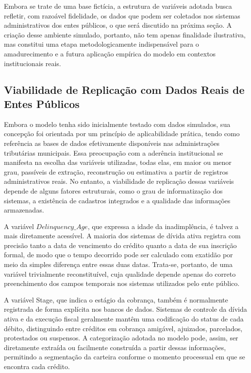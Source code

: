 \documentclass[a4paper,12pt]{article}
\begin{document}
Embora se trate de uma base fictícia, a estrutura de variáveis adotada busca refletir, com razoável fidelidade, os dados que podem ser coletados nos sistemas administrativos dos entes públicos, o que será discutido na próxima seção. A criação desse ambiente simulado, portanto, não tem apenas finalidade ilustrativa, mas constitui uma etapa metodologicamente indispensável para o amadurecimento e a futura aplicação empírica do modelo em contextos institucionais reais.

\subsection{Viabilidade de Replicação com Dados Reais de Entes Públicos}
Embora o modelo tenha sido inicialmente testado com dados simulados, sua concepção foi orientada por um princípio de aplicabilidade prática, tendo como referência as bases de dados efetivamente disponíveis nas administrações tributárias municipais. Essa preocupação com a aderência institucional se manifesta na escolha das variáveis utilizadas, todas elas, em maior ou menor grau, passíveis de extração, reconstrução ou estimativa a partir de registros administrativos reais. No entanto, a viabilidade de replicação dessas variáveis depende de alguns fatores estruturais, como o grau de informatização dos sistemas, a existência de cadastros integrados e a qualidade das informações armazenadas.

A variável $Delinquency\_Age$, que expressa a idade da inadimplência, é talvez a mais diretamente acessível. A maioria dos sistemas de dívida ativa registra com precisão tanto a data de vencimento do crédito quanto a data de sua inscrição formal, de modo que o tempo decorrido pode ser calculado com exatidão por meio da simples diferença entre essas duas datas. Trata-se, portanto, de uma variável trivialmente reconstituível, cuja qualidade depende apenas do correto preenchimento dos campos temporais nos sistemas utilizados pelo ente público.

A variável Stage, que indica o estágio da cobrança, também é normalmente registrada de forma explícita nos bancos de dados. Sistemas de controle da dívida ativa e da execução fiscal geralmente mantêm uma codificação do status de cada débito, distinguindo entre créditos em cobrança amigável, ajuizados, parcelados, protestados ou suspensos. A categorização adotada no modelo pode, assim, ser diretamente extraída ou facilmente construída a partir dessas informações, permitindo a segmentação da carteira conforme o momento processual em que se encontra cada crédito.
\end{document}
